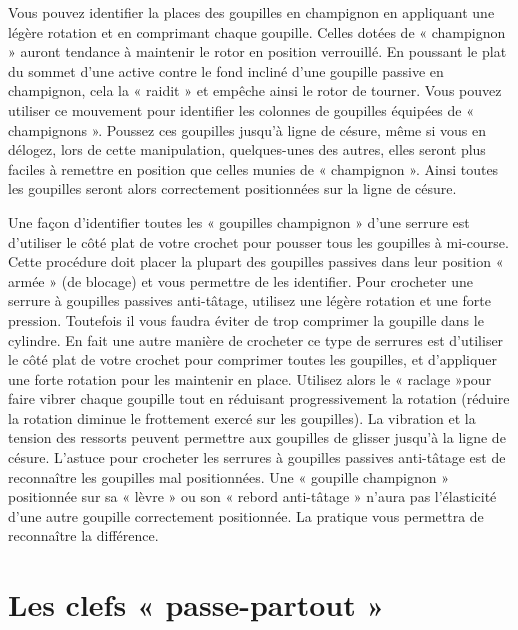 \documentclass[a4paper,french,11pt,twoside]{report}
\begin{document}
Vous pouvez identifier la places des goupilles en champignon en appliquant une légère rotation et en comprimant chaque goupille. Celles dotées de « champignon » auront tendance à maintenir le rotor en position verrouillé. En poussant le plat du sommet d'une active contre le fond incliné d'une goupille passive en champignon, cela la « raidit » et empêche ainsi le rotor de tourner. Vous pouvez utiliser ce mouvement pour identifier les colonnes de goupilles équipées de « champignons ». Poussez ces goupilles jusqu'à ligne de césure, même si vous en délogez, lors de cette manipulation, quelques-unes des autres, elles seront plus faciles à remettre en position que celles munies de « champignon ». Ainsi toutes les goupilles seront alors correctement positionnées sur la ligne de césure.

Une façon d'identifier toutes les « goupilles champignon » d'une serrure est d'utiliser le côté plat de votre crochet pour pousser tous les goupilles à mi-course. Cette procédure doit placer la plupart des goupilles passives dans leur position « armée » (de blocage) et vous permettre de les identifier.
Pour crocheter une serrure à goupilles passives anti-tâtage, utilisez une légère rotation et une forte pression. Toutefois il vous faudra éviter de trop comprimer la goupille dans le cylindre. En fait une autre manière de crocheter ce type de serrures est d'utiliser le côté plat de votre crochet pour comprimer toutes les goupilles, et d'appliquer une forte rotation pour les maintenir en place. Utilisez alors le « raclage »pour faire vibrer chaque goupille tout en réduisant progressivement la rotation (réduire la rotation diminue le frottement exercé sur les goupilles). La vibration et la tension des ressorts peuvent permettre aux goupilles de glisser jusqu'à la ligne de césure. L'astuce pour crocheter les serrures à goupilles passives anti-tâtage est de reconnaître les goupilles mal positionnées. Une « goupille champignon » positionnée sur sa « lèvre » ou son « rebord anti-tâtage » n'aura pas l'élasticité d'une autre goupille correctement positionnée. La pratique vous permettra de reconnaître la différence.

\section{Les clefs « passe-partout »}
\end{document}
